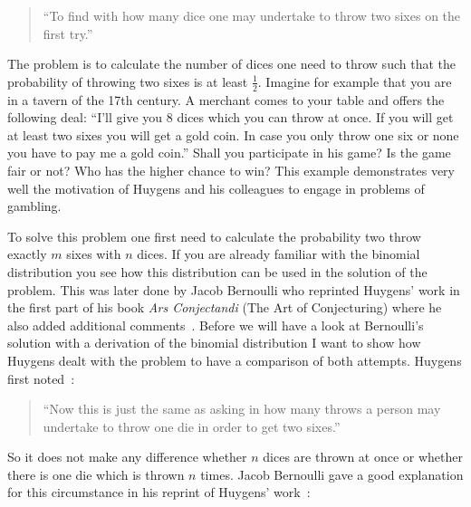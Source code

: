 \begin{quote}
  ``To find with how many dice one may undertake to throw two sixes on the first try.''
\end{quote}


The problem is to calculate the number of dices one need to throw such that the probability of throwing two sixes is at least $\tfrac 12$. Imagine for example that you are in a tavern of the 17th century. A merchant comes to your table and offers the following deal: ``I'll give you $8$ dices which you can throw at once. If you will get at least two sixes you will get a gold coin. In case you only throw one six or none you have to pay me a gold coin.'' Shall you participate in his game? Is the game fair or not? Who has the higher chance to win? This example demonstrates very well the motivation of Huygens and his colleagues to engage in problems of gambling.

To solve this problem one first need to calculate the probability two throw exactly $m$ sixes with $n$ dices. If you are already familiar with the binomial distribution you see how this distribution can be used in the solution of the problem. This was later done by Jacob Bernoulli who reprinted Huygens' work in the first part of his book \emph{Ars Conjectandi} (The Art of Conjecturing) where he also added additional comments~\cite[p. 63]{bernoulli}. Before we will have a look at Bernoulli's solution with a derivation of the binomial distribution I want to show how Huygens dealt with the problem to have a comparison of both attempts. Huygens first noted~\cite[p. 163]{bernoulli}:

\begin{quote}
  ``Now this is just the same as asking in how many throws a person may undertake to throw one die in order to get two sixes.''
\end{quote}

So it does not make any difference whether $n$ dices are thrown at once or whether there is one die which is thrown $n$ times. Jacob Bernoulli gave a good explanation for this circumstance in his reprint of Huygens' work~\cite[p. 163]{bernoulli}:

